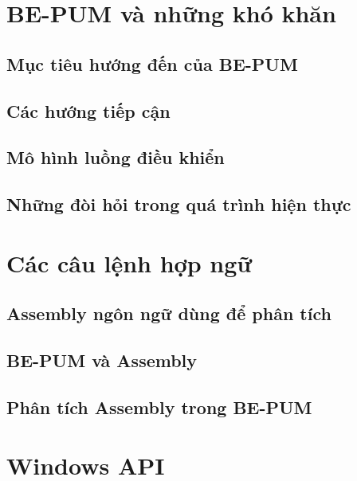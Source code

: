 \section{BE-PUM và những khó khăn}

	\subsection{Mục tiêu hướng đến của BE-PUM}

	\subsection{Các hướng tiếp cận}

	\subsection{Mô hình luồng điều khiển}

	\subsection{Những đòi hỏi trong quá trình hiện thực}


\section{Các câu lệnh hợp ngữ}
  \subsection{Assembly ngôn ngữ dùng để phân tích }
  
  \subsection{BE-PUM và Assembly}
  
  \subsection{Phân tích Assembly trong BE-PUM}

\section{Windows API}
